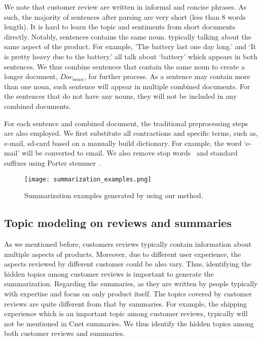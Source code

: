 \documentclass[letterpaper]{article}
\begin{document}
We note that customer review are written in informal and concise phrases. As such, the majority of sentences after parsing are very short (less than 8 words length). It is hard to learn the topic and sentiments from short documents directly. Notably, sentences contains the same noun. typically talking about the same aspect of the product. For example, ’The battery last one day long.’ and ‘It is pretty heavy due to the battery.’ all talk about ‘battery’ which appears in both sentences. We thus combine sentences that contain the same noun to create a longer document, $Doc_{noun}$, for further process. As a sentence may contain more than one noun, such sentence will appear in multiple combined documents. For the sentences that do not have any nouns, they will not be included in any combined documents.

For each sentence and combined document, the traditional preprocessing steps are also employed. We first substitute all contractions and specific terms, such as, e-mail, sd-card based on a manually build dictionary. For example, the word ‘e-mail’ will be converted to email. We also remove stop words~\cite{Nothman2018Stop} and standard suffixes using Porter stemmer~\cite{Porter1980}.

\begin{figure*}[htbp]
\texttt{[image: summarization\_examples.png]}
\caption{Summarization examples generated by using our method.}
\label{summary_examples}
\end{figure*}

\subsection{Topic modeling on reviews and summaries}
As we mentioned before, customers reviews typically contain information about multiple aspects of products. Moreover, due to different user experience, the aspects reviewed by different customer could be also vary. Thus, identifying the hidden topics among customer reviews is important to generate the summarization. Regarding the summaries, as they are written by people typically with expertise and focus on only product itself. The topics covered by customer reviews are quite different from that by summaries. For example, the shipping experience which is an important topic among customer reviews, typically will not be mentioned in Cnet summaries. We thus identify the hidden topics among both customer reviews and summaries. 
\end{document}
